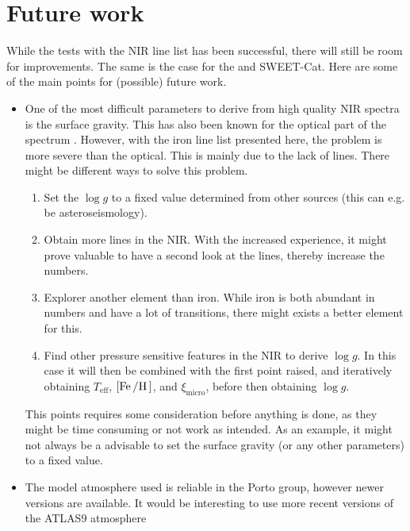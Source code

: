 \section{Future work}

While the tests with the NIR line list has been successful, there will still be room for
improvements. The same is the case for the  and SWEET-Cat. Here are some of the main
points for (possible) future work.

\begin{itemize}
  \item One of the most difficult parameters to derive from high quality NIR spectra is the surface
        gravity. This has also been known for the optical part of the spectrum
        \citep[see e.g.][]{Mortier2014}. However, with the iron line list presented here, the
        problem is more severe than the optical. This is mainly due to the lack of 
        lines. There might be different ways to solve this problem.
        \begin{enumerate}
          \item Set the $\log g$ to a fixed value determined from other sources (this can e.g. be
                asteroseismology).
          \item Obtain more  lines in the NIR. With the increased experience, it might
                prove valuable to have a second look at the  lines, thereby increase the
                numbers.
          \item Explorer another element than iron. While iron is both abundant in numbers and have
                a lot of transitions, there might exists a better element for this.
          \item Find other pressure sensitive features in the NIR to derive $\log g$. In this case
                it will then be combined with the first point raised, and iteratively obtaining
                $T_\mathrm{eff}$, $[\ion{Fe}/\ion{H}]$, and $\xi_\mathrm{micro}$, before then
                obtaining $\log g$.
        \end{enumerate}
        This points requires some consideration before anything is done, as they might be time
        consuming or not work as intended. As an example, it might not always be a advisable to
        set the surface gravity (or any other parameters) to a fixed value.
  \item The model atmosphere used is reliable in the Porto group, however newer versions are
        available. It would be interesting to use more recent versions of the ATLAS9 atmosphere

\end{itemize}
